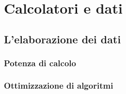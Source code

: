 
\chapter{Calcolatori e dati} %

\label{Chapter2} %



\section{L'elaborazione dei dati}

\subsection{Potenza di calcolo}


\subsection{Ottimizzazione di algoritmi}
